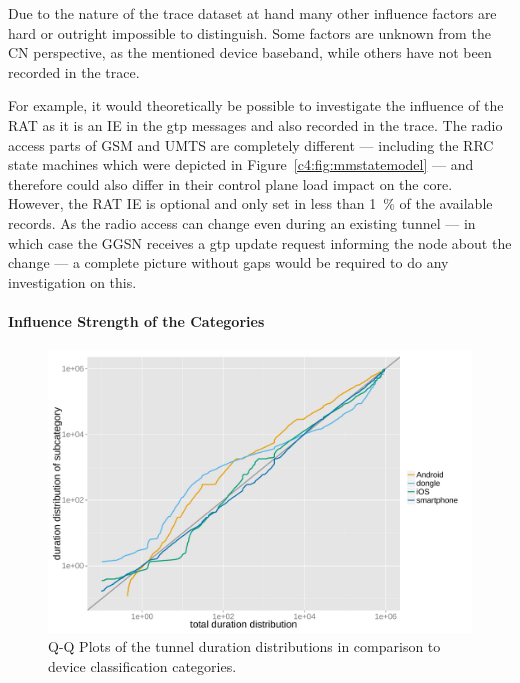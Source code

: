 Due to the nature of the trace dataset at hand many other influence factors are hard or outright impossible to distinguish. Some factors are unknown from the \gls{CN} perspective, as the mentioned device baseband, while others have not been recorded in the trace.

For example, it would theoretically be possible to investigate the influence of the \gls{RAT} as it is an \gls{IE} in the \gls{gtp} messages and also recorded in the trace. The radio access parts of \gls{GSM} and \gls{UMTS} are completely different --- including the \gls{RRC} state machines which were depicted in Figure~\ref{c4:fig:mmstatemodel} --- and therefore could also differ in their control plane load impact on the core. However, the \gls{RAT} \gls{IE} is optional and only set in less than \SI{1}{\percent} of the available records. As the radio access can change even during an existing tunnel --- in which case the \gls{GGSN} receives a \gls{gtp} update request informing the node about the change --- a complete picture without gaps would be required to do any investigation on this.


\paragraph{Influence Strength of the Categories}

\begin{figure}[htb]
	\centering
	\includegraphics[width=1.0\textwidth]{images/R-duration-qq-category-comparison.pdf}
	\caption{Q-Q Plots of the tunnel duration distributions in comparison to device classification categories.}
\label{c4:fig:qq-plots}
\end{figure}


